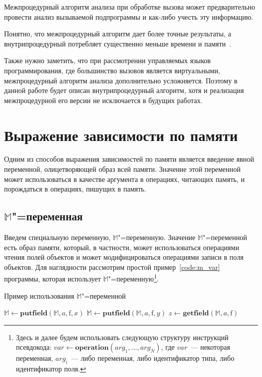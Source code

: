 \documentclass[14pt,titlepage,draft]{extarticle}
\newcommand{\M}{\ensuremath{\mathbb{M}}}
\newcommand{\field}[1]{\mathrm{#1}}
\newcommand{\op}[1]{\mathbf{#1}}
\begin{document}
      Межпроцедурный алгоритм анализа при обработке вызова может предварительно
      провести анализ вызываемой подпрограммы и как-либо учесть эту информацию.

      Понятно, что межпроцедурный алгоритм дает более точные результаты,
      а внутрипроцедурный потребляет существенно меньше времени и
      памяти~\cite[с.~117]{andersen}.

      Также нужно заметить, что при рассмотрении управляемых языков
      программирования, где большинство вызовов является виртуальными,
      межпроцедурный алгоритм анализа дополнительно усложняется. Поэтому в
      данной работе будет описан внутрипроцедурный алгоритм, хотя и реализация
      межпроцедурной его версии не исключается в будущих работах.

  \section{Выражение зависимости по памяти}
    \label{section:m_variable}

    Одним из способов выражения зависимостей по памяти является введение
    явной переменной, олицетворяющей образ всей памяти. Значение этой
    переменной может использоваться в качестве аргумента в операциях, читающих
    память, и порождаться в операциях, пишущих в память.

    \subsection{\texorpdfstring{\M}{M}"=переменная}

      Введем специальную переменную, \M"=переменную. Значение \M"=переменной
      есть образ памяти, который, в частности, может использоваться операциями
      чтения полей объектов и может модифицироваться операциями записи в поля
      объектов. Для наглядности рассмотрим простой пример~\ref{code:m_var}
      программы, которая использует \M"=переменную\footnote{
        Здесь и далее будем использовать следующую структуру инструкций
        псевдокода: $var \gets \op{operation}(arg_1, \ldots, arg_N)$, где
        $var$~--- некоторая переменная, $arg_i$~--- либо переменная, либо
        идентификатор типа, либо идентификатор поля.}.

      \begin{algorithm}
        \caption{Пример использования \M"=переменной}
        \label{code:m_var}
        \begin{algorithmic}[1]
          \If{\ldots}
            \State $\M \gets \op{putfield}(\M, a, \field{f}, x)$
          \Else
            \State $\M \gets \op{putfield}(\M, a, \field{f}, y)$
          \EndIf
          \State $z \gets \op{getfield}(\M, a, \field{f})$
        \end{algorithmic}
      \end{algorithm}
\end{document}
